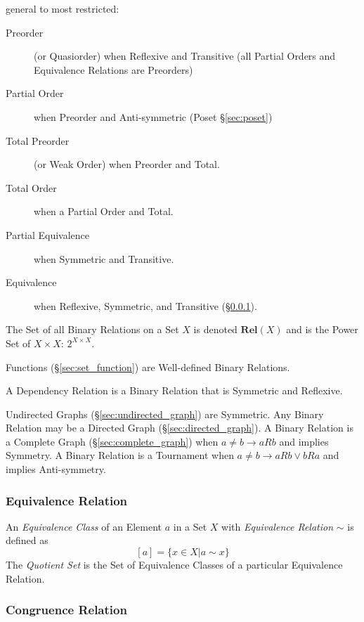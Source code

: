 general to most restricted:
\begin{description}
\item[Preorder] (or Quasiorder) when Reflexive and Transitive (all
  Partial Orders and Equivalence Relations are Preorders)
\item[Partial Order] when Preorder and Anti-symmetric (Poset
  \S\ref{sec:poset})
\item[Total Preorder] (or Weak Order) when Preorder and Total.
\item[Total Order] when a Partial Order and Total.
\item[Partial Equivalence] when Symmetric and Transitive.
\item[Equivalence] when Reflexive, Symmetric, and Transitive
  (\S\ref{sec:equivalence_relation}).
\end{description}

The Set of all Binary Relations on a Set $X$ is denoted
$\mathbf{Rel}(X)$ and is the Power Set of $X \times X$: $2^{X \times
  X}$.

Functions (\S\ref{sec:set_function}) are Well-defined Binary Relations.

A Dependency Relation is a Binary Relation that is Symmetric and
Reflexive.

Undirected Graphs (\S\ref{sec:undirected_graph}) are Symmetric.
Any Binary Relation may be a Directed Graph
(\S\ref{sec:directed_graph}). A Binary Relation is a Complete Graph
(\S\ref{sec:complete_graph}) when $a \neq b \rightarrow aRb$ and
implies Symmetry. A Binary Relation is a Tournament when $a \neq b
\rightarrow aRb \vee bRa$ and implies Anti-symmetry.



\subsubsection{Equivalence Relation}\label{sec:equivalence_relation}

An \emph{Equivalence Class} of an Element $a$ in a Set $X$ with
\emph{Equivalence Relation} $\sim$ is defined as
\[
    [a] = \{x \in X | a \sim x\}
\]
The \emph{Quotient Set} is the Set of Equivalence Classes of a
particular Equivalence Relation.



\subsubsection{Congruence Relation}\label{sec:congruence_relation}

